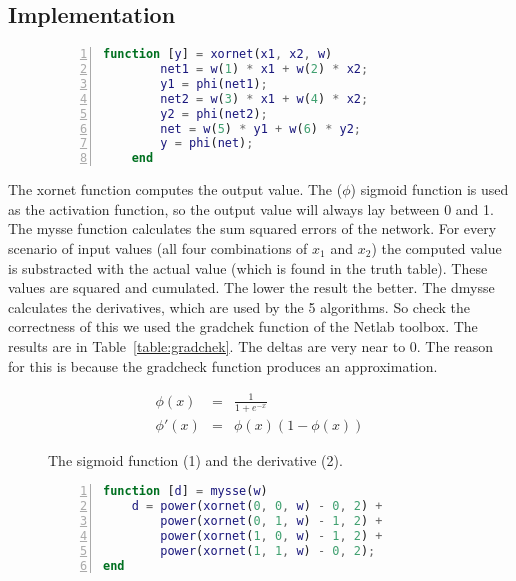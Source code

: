 \documentclass{article}
\begin{document}
\subsection{Implementation}

\begin{figure}[h]
	\begin{lstlisting}[caption={The computation of the output value, based on the input values and the weights.}, captionpos=b, language=matlab, numbers=left, tabsize=4, frame=single, basicstyle=\footnotesize]
	function [y] = xornet(x1, x2, w)
		net1 = w(1) * x1 + w(2) * x2;
	 	y1 = phi(net1);
		net2 = w(3) * x1 + w(4) * x2;
	 	y2 = phi(net2);
		net = w(5) * y1 + w(6) * y2;
	 	y = phi(net);
	end
	\end{lstlisting}
\end{figure}

The xornet function computes the output value. The ($\phi$) sigmoid function is used as the activation function, so the output value will always lay between 0 and 1. The mysse function calculates the sum squared errors of the network. For every scenario of input values (all four combinations of $x_1$ and $x_2$) the computed value is substracted with the actual value (which is found in the truth table). These values are squared and cumulated. The lower the result the better. The dmysse calculates the derivatives, which are used by the 5 algorithms. So check the correctness of this we used the gradchek function of the Netlab toolbox. The results are in Table~\ref{table:gradchek}. The deltas are very near to 0. The reason for this is because the gradcheck function produces an approximation. 

\begin{figure}
	\centering
	\begin{eqnarray}
	 \phi(x) & = & \frac{1}{1 + e^{-x}} \\
	   \phi'(x) & = & \phi(x)(1 - \phi(x))
	\end{eqnarray}
	\caption{The sigmoid function (1) and the derivative (2).}
\end{figure}

\begin{figure}
	\begin{lstlisting}[caption={The calculation of the sum squared error of the weights.}, captionpos=b, language=matlab, numbers=left, tabsize=4, frame=single, basicstyle=\footnotesize, breaklines=true]
function [d] = mysse(w)
	d = power(xornet(0, 0, w) - 0, 2) + 
		power(xornet(0, 1, w) - 1, 2) + 
		power(xornet(1, 0, w) - 1, 2) + 
		power(xornet(1, 1, w) - 0, 2);
end
	\end{lstlisting}
\end{figure}
\end{document}
